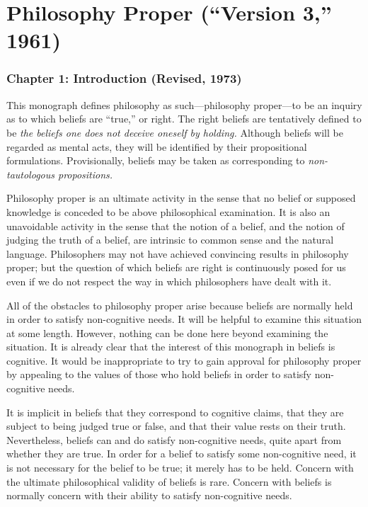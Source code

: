 \newcommand{\stress}[1]{\textbf{#1}}

\chapter[Philosophy Proper (\enquote{Version 3,} 1961)][Philosophy Proper]{Philosophy Proper (\enquote{Version 3,} 1961)}
\renewcommand*{\thesection}{\Alph{section}}
\subsection[Chapter 1: Introduction (Revised, 1973)][Introduction]{Chapter 1: Introduction (Revised, 1973)}

This monograph defines philosophy as such---philosophy proper---to be 
an inquiry as to which beliefs are \enquote{true,} or right. The right beliefs are 
tentatively defined to be \emph{the beliefs one does not deceive oneself by holding.}
Although beliefs will be regarded as mental acts, they will be identified by 
their propositional formulations. Provisionally, beliefs may be taken as 
corresponding to \emph{non-tautologous propositions.}

Philosophy proper is an ultimate activity in the sense that no belief or 
supposed knowledge is conceded to be above philosophical examination. It is 
also an unavoidable activity in the sense that the notion of a belief, and the 
notion of judging the truth of a belief, are intrinsic to common sense and the 
natural language. Philosophers may not have achieved convincing results in 
philosophy proper; but the question of which beliefs are right is 
continuously posed for us even if we do not respect the way in which 
philosophers have dealt with it. 

All of the obstacles to philosophy proper arise because beliefs are 
normally held in order to satisfy non-cognitive needs. It will be helpful to 
examine this situation at some length. However, nothing can be done here 
beyond examining the situation. It is already clear that the interest of this 
monograph in beliefs is cognitive. It would be inappropriate to try to gain 
approval for philosophy proper by appealing to the values of those who hold 
beliefs in order to satisfy non-cognitive needs. 

It is implicit in beliefs that they correspond to cognitive claims, that 
they are subject to being judged true or false, and that their value rests on 
their truth. Nevertheless, beliefs can and do satisfy non-cognitive needs, 
quite apart from whether they are true. In order for a belief to satisfy some 
non-cognitive need, it is not necessary for the belief to be true; it merely has 
to be held. Concern with the ultimate philosophical validity of beliefs is rare. 
Concern with beliefs is normally concern with their ability to satisfy 
non-cognitive needs. 

